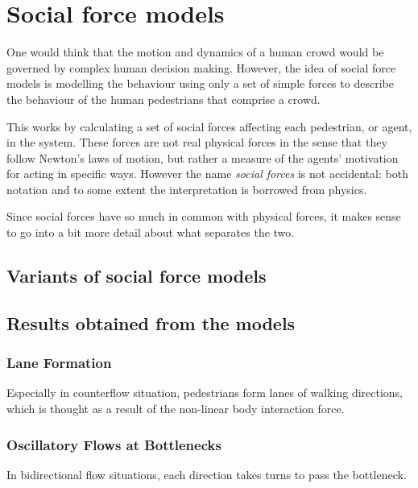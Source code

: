 \section{Social force models}
\label{sec:social-forces}
One would think that the motion and dynamics of a human crowd would be 
governed by complex human decision making. However, the idea of social force 
models is modelling the behaviour using only a set of simple forces to 
describe the behaviour of the human pedestrians that comprise a crowd.

This works by calculating a set of social forces affecting each pedestrian, or 
agent, in the system. These forces are not real physical forces in the sense 
that they follow Newton's laws of motion, but rather a measure of the agents' 
motivation for acting in specific ways. However the name \emph{social forces} 
is not accidental: both notation and to some extent the interpretation is 
borrowed from physics. 

Since social forces have so much in common with physical forces, it makes 
sense to go into a bit more detail about what separates the two.

\subsection{Variants of social force models}

\subsection{Results obtained from the models}

\subsubsection{Lane Formation}
Especially in counterflow situation, pedestrians form lanes of walking 
directions, which is thought as a result of the non-linear body interaction 
force.

\subsubsection{Oscillatory Flows at Bottlenecks}
In bidirectional flow situations, each direction takes turns to pass the 
bottleneck.

